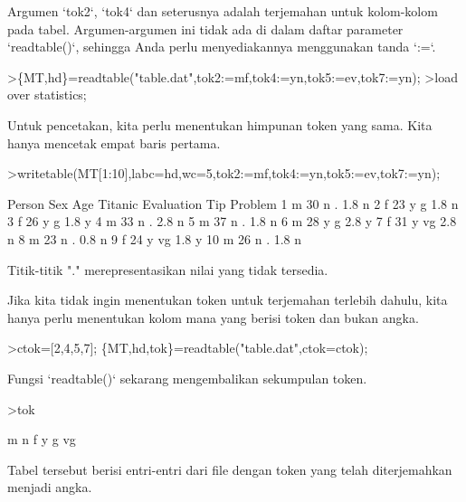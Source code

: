 \documentclass{article}
\newenvironment{eulernotebook}{\par}{\par}
\newenvironment{eulercomment}{\par\medskip}{\par\medskip}
\begin{document}
\begin{eulernotebook}
\begin{eulercomment}
Argumen `tok2`, `tok4` dan seterusnya adalah terjemahan untuk
kolom-kolom pada tabel. Argumen-argumen ini tidak ada di dalam daftar
parameter `readtable()`, sehingga Anda perlu menyediakannya
menggunakan tanda `:=`.
\end{eulercomment}
\begin{eulerprompt}
>\{MT,hd\}=readtable("table.dat",tok2:=mf,tok4:=yn,tok5:=ev,tok7:=yn);
>load over statistics;
\end{eulerprompt}
\begin{eulercomment}
Untuk pencetakan, kita perlu menentukan himpunan token yang sama. Kita
hanya mencetak empat baris pertama.
\end{eulercomment}
\begin{eulerprompt}
>writetable(MT[1:10],labc=hd,wc=5,tok2:=mf,tok4:=yn,tok5:=ev,tok7:=yn);
\end{eulerprompt}
\begin{euleroutput}
   Person  Sex  Age Titanic Evaluation  Tip Problem
        1    m   30       n          .  1.8       n
        2    f   23       y          g  1.8       n
        3    f   26       y          g  1.8       y
        4    m   33       n          .  2.8       n
        5    m   37       n          .  1.8       n
        6    m   28       y          g  2.8       y
        7    f   31       y         vg  2.8       n
        8    m   23       n          .  0.8       n
        9    f   24       y         vg  1.8       y
       10    m   26       n          .  1.8       n
\end{euleroutput}
\begin{eulercomment}
Titik-titik "." merepresentasikan nilai yang tidak tersedia.

Jika kita tidak ingin menentukan token untuk terjemahan terlebih
dahulu, kita hanya perlu menentukan kolom mana yang berisi token dan
bukan angka.
\end{eulercomment}
\begin{eulerprompt}
>ctok=[2,4,5,7]; \{MT,hd,tok\}=readtable("table.dat",ctok=ctok);
\end{eulerprompt}
\begin{eulercomment}
Fungsi `readtable()` sekarang mengembalikan sekumpulan token.
\end{eulercomment}
\begin{eulerprompt}
>tok
\end{eulerprompt}
\begin{euleroutput}
  m
  n
  f
  y
  g
  vg
\end{euleroutput}
\begin{eulercomment}
Tabel tersebut berisi entri-entri dari file dengan token yang telah
diterjemahkan menjadi angka.


\end{eulercomment}
\end{eulernotebook}
\end{document}
